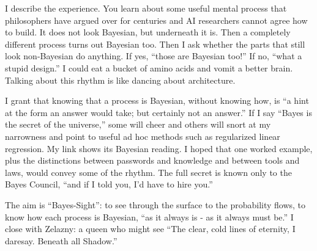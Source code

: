 I describe the experience. You learn about some useful mental process that philosophers have argued over for centuries and AI researchers cannot agree how to build. It does not look Bayesian, but underneath it is. Then a completely different process turns out Bayesian too. Then I ask whether the parts that still look non-Bayesian do anything. If yes, ``those are Bayesian too!'' If no, ``what a stupid design.'' I could eat a bucket of amino acids and vomit a better brain. Talking about this rhythm is like dancing about architecture. 

I grant that knowing that a process is Bayesian, without knowing how, is ``a hint at the form an answer would take; but certainly not an answer.''  If I say ``Bayes is the secret of the universe,'' some will cheer and others will snort at my narrowness and point to useful ad hoc methods such as regularized linear regression. My link shows its Bayesian reading. I hoped that one worked example, plus the distinctions between passwords and knowledge and between tools and laws, would convey some of the rhythm. The full secret is known only to the Bayes Council, ``and if I told you, I'd have to hire you.'' 

The aim is ``Bayes-Sight'': to see through the surface to the probability flows, to know how each process is Bayesian, ``as it always is - as it always must be.'' I close with Zelazny: a queen who might see ``The clear, cold lines of eternity, I daresay. Beneath all Shadow.''
